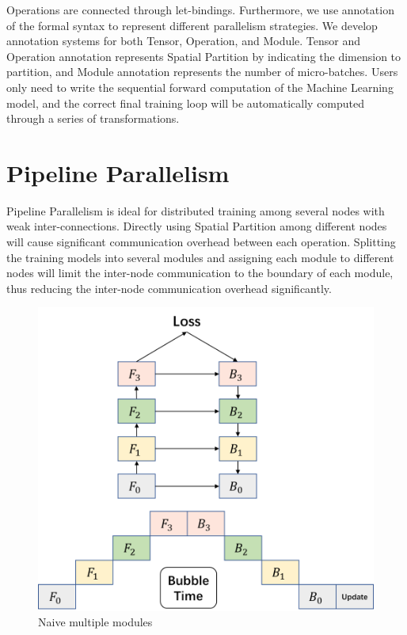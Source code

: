 \documentclass[sigplan, nonacm]{acmart}\settopmatter{printfolios=true,printccs=false,printacmref=false}
\begin{document}
Operations are connected through let-bindings. Furthermore, we use annotation of the formal syntax to represent different parallelism strategies. We develop annotation systems for both Tensor, Operation, and Module. Tensor and Operation annotation represents Spatial Partition by indicating the dimension to partition, and Module annotation represents the number of micro-batches. Users only need to write the sequential forward computation of the Machine Learning model, and the correct final training loop will be automatically computed through a series of transformations.
 \section{Pipeline Parallelism} \label{pipelineparallism}
 Pipeline Parallelism is ideal for distributed training among several nodes with weak inter-connections. Directly using Spatial Partition among different nodes will cause significant communication overhead between each operation. Splitting the training models into several modules and assigning each module to different nodes will limit the inter-node communication to the boundary of each module, thus reducing the inter-node communication overhead significantly.\par
 \begin{figure}[htbp]
  \centering
  \includegraphics[scale=0.4]{NormalPipeline}
  \caption{Naive multiple modules}
  \label{fig:multiplemodule}
\end{figure}
\end{document}
